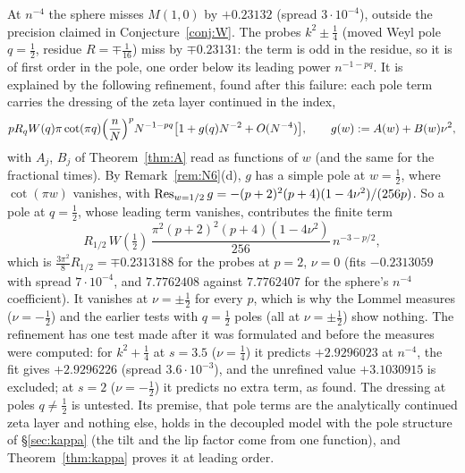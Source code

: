 \begin{remark}\label{rem:Wprime}
At $n^{-4}$ the sphere misses $M(1,0)$ by $+0.23132$ (spread $3\cdot10^{-4}$), outside the precision claimed in
Conjecture~\ref{conj:W}. The probes $k^2\pm\frac14$ (moved Weyl pole $q=\frac12$, residue $R=\mp\frac1{16}$) miss by $\mp0.23131$: the term is
odd in the residue, so it is of first order in the pole, one order below its leading power $n^{-1-pq}$. It is explained by the following
refinement, found after this failure: each pole term carries the dressing of the zeta layer continued in the index,
\[
  pR_qW(q)\pi\cot(\pi q)\Bigl(\frac nN\Bigr)^pN^{-1-pq}\bigl[1+g(q)N^{-2}+O(N^{-4})\bigr],\qquad g(w):=A(w)+B(w)\nu^2,
\]
with $A_j$, $B_j$ of Theorem~\ref{thm:A} read as functions of $w$ (and the same for the fractional times). By Remark~\ref{rem:N6}(d),
$g$ has a simple pole at $w=\frac12$, where $\cot(\pi w)$ vanishes, with $\operatorname{Res}_{w=1/2}g=-(p+2)^2(p+4)(1-4\nu^2)/(256p)$. So a pole at
$q=\frac12$, whose leading term vanishes, contributes the finite term
\[
  R_{1/2}\,W(\tfrac12)\,\frac{\pi^2(p+2)^2(p+4)(1-4\nu^2)}{256}\,n^{-3-p/2},
\]
which is $\frac{3\pi^2}8R_{1/2}=\mp0.2313188$ for the probes at $p=2$, $\nu=0$ (fits $-0.2313059$ with spread $7\cdot10^{-4}$, and $7.7762408$
against $7.7762407$ for the sphere's $n^{-4}$ coefficient). It vanishes at $\nu=\pm\frac12$ for every $p$, which is why the Lommel measures
($\nu=-\frac12$) and the earlier tests with $q=\frac12$ poles (all at $\nu=\pm\frac12$) show nothing. The refinement has one test made after
it was formulated and before the measures were computed: for $k^2+\frac14$ at $s=3.5$ ($\nu=\frac14$) it predicts $+2.9296023$ at $n^{-4}$, the
fit gives $+2.9296226$ (spread $3.6\cdot10^{-3}$), and the unrefined value $+3.1030915$ is excluded; at $s=2$ ($\nu=-\frac12$) it predicts no
extra term, as found. The dressing at poles $q\ne\frac12$ is untested. Its premise, that pole terms are the analytically continued
zeta layer and nothing else, holds in the decoupled model with the pole structure of \S\ref{sec:kappa} (the tilt and the lip factor come
from one function), and Theorem~\ref{thm:kappa} proves it at leading order.
\end{remark}


